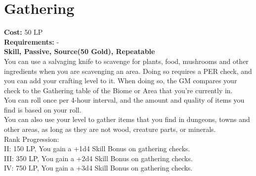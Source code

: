 \section{Gathering}\label{perk:gathering}
\textbf{Cost:} 50 LP\\
\textbf{Requirements:} -\\
\textbf{Skill, Passive, Source(50 Gold), Repeatable}\\
You can use a salvaging knife to scavenge for plants, food, mushrooms and other ingredients when you are scavenging an area.
Doing so requires a PER check, and you can add your crafting level to it.
When doing so, the GM compares your check to the Gathering table of the Biome or Area that you're currently in.\\
You can roll once per 4-hour interval, and the amount and quality of items you find is based on your roll.\\
You can also use your level to gather items that you find in dungeons, towns and other areas, as long as they are not wood, creature parts, or minerals.
\\
Rank Progression:\\
II: 150 LP, You gain a +1d4 Skill Bonus on gathering checks.\\
III: 350 LP, You gain a +2d4 Skill Bonus on gathering checks.\\
IV: 750 LP, You gain a +3d4 Skill Bonus on gathering checks.\\